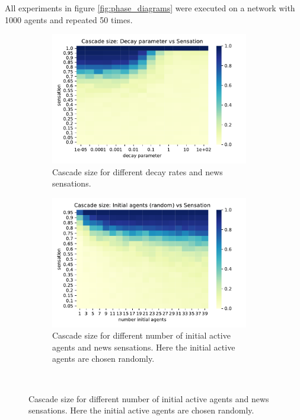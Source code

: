 \documentclass[10pt]{article}
\begin{document}
All experiments in figure \ref{fig:phase_diagrams} were executed on a network with 1000 agents and repeated 50 times.

\begin{figure}
    \centering
    \begin{subfigure}{0.48\textwidth}
      \centering
      \includegraphics[width=0.95\textwidth]{images/decay_sensation.pdf}
      \caption{Cascade size for different decay rates and news sensations.}
      \label{fig:decay_sensation}
    \end{subfigure}\hfill
    \begin{subfigure}{0.48\textwidth}
      \centering
      \includegraphics[width=0.95\textwidth]{images/initial_sensation_random.pdf}
      \caption{Cascade size for different number of initial active agents and news sensations. Here the initial active agents are chosen randomly.}
      \label{fig:initial_sensation_random}
    \end{subfigure}\\

\end{figure}
\end{document}
